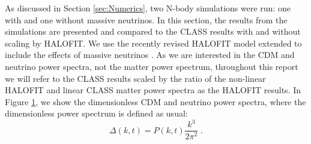 \documentclass[twocolumn,superscriptaddress,prd]{revtex4}
\newcommand{\halofit}{HALOFIT }
\newcommand{\halofitns}{HALOFIT}
\begin{document}
\begin{figure}[h!]
{   %
}\label{fig:density}
\end{figure}


As discussed in Section \ref{sec:Numerics}, two 
N-body simulations were
run: one  with and one without massive neutrinos. 
In this section, the results from the simulations are
presented and compared to the CLASS results with and without scaling by \halofitns.  We use the recently
revised \halofit model \citep{takahashi12} extended to include the effects of massive
neutrinos \citep{bird12}. As we are interested in the CDM
and neutrino power spectra, not the matter power spectrum, throughout
this report we will refer to the CLASS results scaled by the
ratio of the non-linear \halofit and linear CLASS matter power spectra
as the \halofit results.
In Figure \ref{fig:density}, we
show the dimensionless CDM and neutrino power spectra,
where the dimensionless power spectrum is defined as usual:
\begin{equation}
  \Delta(k,t) = P(k,t) \frac{ k^3 }{2 \pi^2} \;.
\end{equation} 
\end{document}
